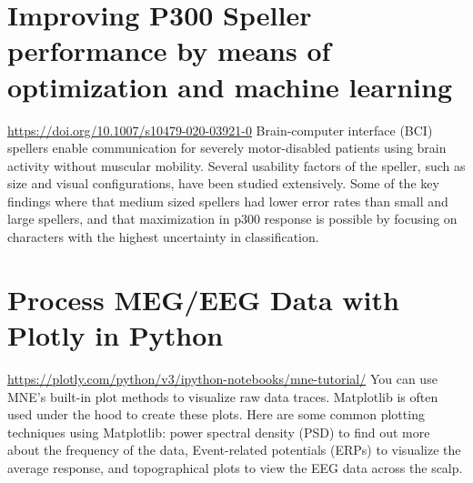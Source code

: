 \documentclass[12pt]{article}
\begin{document}
\section{Improving P300 Speller performance by means of optimization and machine learning}
\url{https://doi.org/10.1007/s10479-020-03921-0}
Brain-computer interface (BCI) spellers enable communication for severely motor-disabled patients using brain activity without muscular mobility. Several usability factors of the speller, such as size and visual configurations, have been studied extensively. Some of the key findings where that medium sized spellers had lower error rates than small and large spellers, and that maximization in p300 response is possible by focusing on characters with the highest uncertainty in classification.

\section{Process MEG/EEG Data with Plotly in Python}
\url{https://plotly.com/python/v3/ipython-notebooks/mne-tutorial/}
You can use MNE's built-in plot methods to visualize raw data traces. Matplotlib is often used under the hood to create these plots. Here are some common plotting techniques using Matplotlib: power spectral density (PSD) to find out more about the frequency of the data, Event-related potentials (ERPs) to visualize the average response, and topographical plots to view the EEG data across the scalp. 
\end{document}
